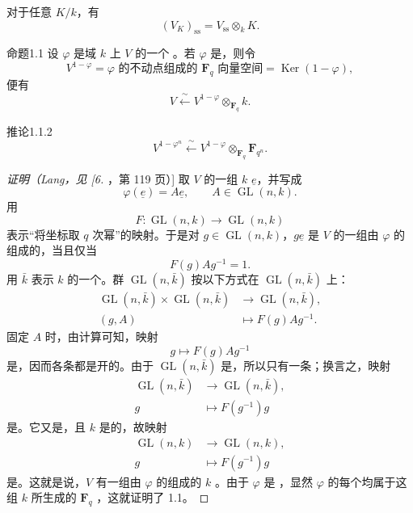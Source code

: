 对于任意 $K/k$，有
\[
(V_K)_{\mathrm{ss}}=V_{\mathrm{ss}}\otimes_k K. \tag{1.0.10}
\]
\begin{SGAresult}{命题}{1.1}
设 $\varphi$ 是域 $k$ 上 $V$ 的一个 。若 $\varphi$ 是，则令
\[
V^{1-\varphi}=\varphi\text{ 的不动点组成的 }\mathbf F_q\text{ 向量空间}
=\operatorname{Ker}(1-\varphi),
\]
便有
\[
V\xleftarrow{\ \sim\ }V^{1-\varphi}\otimes_{\mathbf F_q}k. \tag{1.1.1}
\]
\end{SGAresult}
\begin{SGAresult}{推论}{1.1.2}
\[
V^{1-\varphi^n}\xleftarrow{\ \sim\ }
V^{1-\varphi}\otimes_{\mathbf F_q}\mathbf F_{q^n}.
\]
\end{SGAresult}
\begin{proof}[证明（Lang，见 [6]，第 119 页）]
取 $V$ 的一组 $k$  $\underline e$，并写成
\[
\varphi(\underline e)=A\underline e,\qquad A\in\operatorname{GL}(n,k). \tag{1.1.3}
\]
用
\[
F:\operatorname{GL}(n,k)\longrightarrow\operatorname{GL}(n,k) \tag{1.1.4}
\]
表示“将坐标取 $q$ 次幂”的映射。于是对 $g\in\operatorname{GL}(n,k)$，$g\underline e$ 是 $V$ 的一组由 $\varphi$ 的组成的，当且仅当
\[
F(g)Ag^{-1}=1. \tag{1.1.5}
\]
用 $\bar k$ 表示 $k$ 的一个。群 $\operatorname{GL}(n,\bar k)$ 按以下方式在 $\operatorname{GL}(n,\bar k)$ 上：
\[
\begin{aligned}
\operatorname{GL}(n,\bar k)\times\operatorname{GL}(n,\bar k)
&\longrightarrow\operatorname{GL}(n,\bar k),\\
(g,A)&\longmapsto F(g)Ag^{-1}.
\end{aligned} \tag{1.1.6}
\]
固定 $A$ 时，由计算可知，映射
\[
g\longmapsto F(g)Ag^{-1} \tag{1.1.7}
\]
是，因而各条都是开的。由于 $\operatorname{GL}(n,\bar k)$ 是，所以只有一条；换言之，映射
\[
\begin{aligned}
\operatorname{GL}(n,\bar k)&\longrightarrow\operatorname{GL}(n,\bar k),\\
g&\longmapsto F(g^{-1})g
\end{aligned} \tag{1.1.8}
\]
是。它又是，且 $k$ 是的，故映射
\[
\begin{aligned}
\operatorname{GL}(n,k)&\longrightarrow\operatorname{GL}(n,k),\\
g&\longmapsto F(g^{-1})g
\end{aligned} \tag{1.1.9}
\]
是。这就是说，$V$ 有一组由 $\varphi$ 的组成的 $k$ 。由于 $\varphi$ 是 ，显然 $\varphi$ 的每个均属于这组 $k$ 所生成的 $\mathbf F_q$ ，这就证明了 1.1。
\end{proof}
